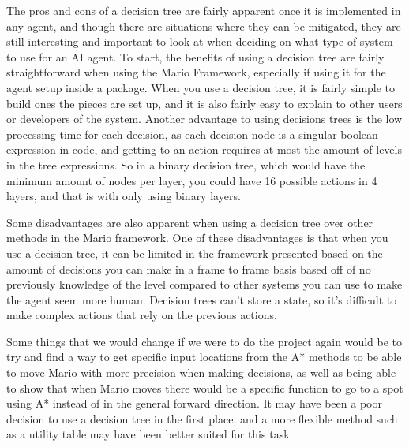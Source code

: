 \documentclass[a4paper, 10pt]{article}
\begin{document}
The pros and cons of a decision tree are fairly apparent once it is implemented
in any agent, and though there are situations where they can be mitigated, they
are still interesting and important to look at when deciding on what type of
system to use for an AI agent. To start, the benefits of using a decision tree
are fairly straightforward when using the Mario Framework, especially if using
it for the agent setup inside a package. When you use a decision tree, it is
fairly simple to build ones the pieces are set up, and it is also fairly easy to
explain to other users or developers of the system. Another advantage to using
decisions trees is the low processing time for each decision, as each decision
node is a singular boolean expression in code, and getting to an action requires
at most the amount of levels in the tree expressions. So in a binary decision
tree, which would have the minimum amount of nodes per layer, you could have 16
possible actions in 4 layers, and that is with only using binary layers.

Some disadvantages are also apparent when using a decision tree over other
methods in the Mario framework. One of these disadvantages is that when you use
a decision tree, it can be limited in the framework presented based on the
amount of decisions you can make in a frame to frame basis based off of no
previously knowledge of the level compared to other systems you can use to make
the agent seem more human. Decision trees can't store a state, so it's difficult
to make complex actions that rely on the previous actions.

Some things that we would change if we were to do the project again would be to
try and find  a way to get specific input locations from the A* methods to be
able to move Mario with more precision when making decisions, as well as being
able to show that when Mario moves there would be a specific function to go to a
spot using A* instead of in the general forward direction. It may have been a
poor decision to use a decision tree in the first place, and a more flexible
method such as a utility table may have been better suited for this task.
\end{document}
